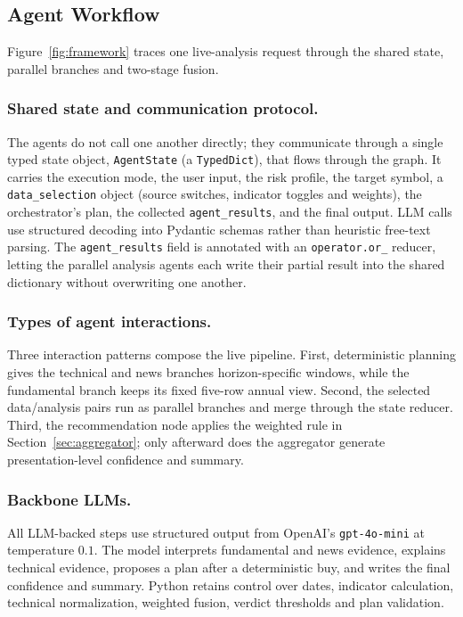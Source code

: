 \documentclass[runningheads]{llncs}
\begin{document}
\subsection{Agent Workflow}
\label{sec:workflow}

Figure~\ref{fig:framework} traces one live-analysis request through the shared
state, parallel branches and two-stage fusion.

\subsubsection{Shared state and communication protocol.}
The agents do not call one another directly; they communicate through a single
typed state object, \texttt{AgentState} (a \texttt{TypedDict}), that flows through
the graph. It carries the execution mode, the user input, the risk profile, the
target symbol, a \texttt{data\_selection} object (source switches, indicator
toggles and weights), the orchestrator's plan, the collected
\texttt{agent\_results}, and the final output. LLM calls use structured decoding
into Pydantic schemas rather than heuristic free-text parsing. The
\texttt{agent\_results} field is annotated with an
\texttt{operator.or\_} reducer, letting the parallel analysis agents each write
their partial result into the shared dictionary without overwriting one another.

\subsubsection{Types of agent interactions.}
Three interaction patterns compose the live pipeline. First, deterministic
planning gives the technical and news branches horizon-specific windows, while the
fundamental branch keeps its fixed five-row annual view. Second, the selected
data/analysis pairs run as parallel branches and merge through the state reducer.
Third, the recommendation node applies the weighted rule in
Section~\ref{sec:aggregator}; only afterward does the aggregator generate
presentation-level confidence and summary.

\subsubsection{Backbone LLMs.}
All LLM-backed steps use structured output from OpenAI's
\texttt{gpt-4o-mini} at temperature $0.1$. The model interprets fundamental and news
evidence, explains technical evidence, proposes a plan after a deterministic buy,
and writes the final confidence and summary. Python retains control over dates,
indicator calculation, technical normalization, weighted fusion, verdict thresholds
and plan validation.
\end{document}

